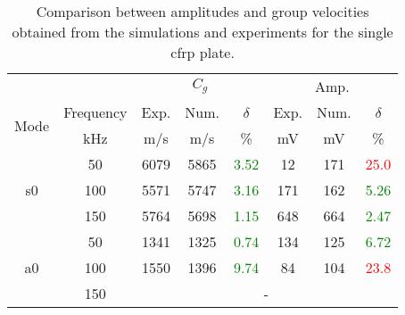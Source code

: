 \begin{table}[!htb]
	\small
	\tabcolsep=0.2cm
	\centering
	\caption{\label{tab:group_velocity_cfrp} Comparison between amplitudes and group velocities obtained from the simulations and experiments for the single \acf{cfrp} plate.}
	\begin{tabular}{cccccccc}
		\toprule
		& & \multicolumn{3}{c}{\(C_g\)} & \multicolumn{3}{c}{Amp.}\\
		\multirow{2}{*}{Mode} & Frequency & Exp. & Num. & \(\delta\)& Exp. & Num. & \(\delta\)\\
		& \unit{\kHz} & \unit[per-mode = symbol]{\m\per\s} & \unit[per-mode = symbol]{\m\per\s} & \% & \unit{\mV} & \unit{\mV} & \% \\
		\midrule
		\multirow{3}{*}{\ac{s0}} & 50 & 6079 & 5865 & \textcolor{green}{3.52}& 12 & 171 & \textcolor{red}{25.0} \\
		&100& 5571 & 5747 & \textcolor{green}{3.16} & 171 & 162 & \textcolor{green}{5.26}\\
		&150& 5764 & 5698 & \textcolor{green}{1.15} & 648 & 664 & \textcolor{green}{2.47}\\
		\midrule
		\multirow{3}{*}{\ac{a0}} &50& 1341 & 1325 & \textcolor{green}{0.74} & 134 & 125 & \textcolor{green}{6.72}\\
		&100& 1550 & 1396 & \textcolor{green}{9.74} & 84 & 104 & \textcolor{red}{23.8}\\
		&150& \multicolumn{6}{c}{-} \\
		\bottomrule
	\end{tabular}
\end{table}
